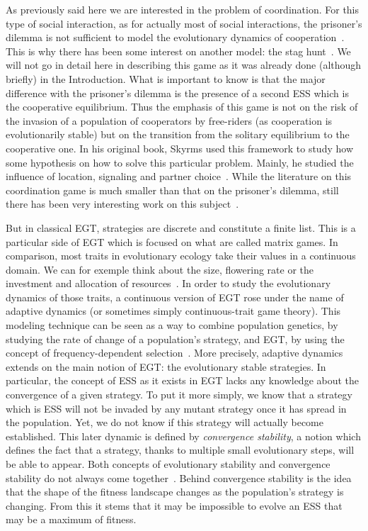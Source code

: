     As previously said here we are interested in the problem of coordination. For this type of social interaction, as for actually most of social interactions, the prisoner's dilemma is not sufficient to model the evolutionary dynamics of cooperation~\cite{Alvard2002, Skyrms2004}. This is why there has been some interest on another model: the stag hunt~\cite{Skyrms2004, RequejoMartinez2013}. We will not go in detail here in describing this game as it was already done (although briefly) in the Introduction. What is important to know is that the major difference with the prisoner's dilemma is the presence of a second ESS which is the cooperative equilibrium. Thus the emphasis of this game is not on the risk of the invasion of a population of cooperators by free-riders (as cooperation is evolutionarily stable) but on the transition from the solitary equilibrium to the cooperative one. In his original book, Skyrms used this framework to study how some hypothesis on how to solve this particular problem. Mainly, he studied the influence of location, signaling and partner choice~\cite{Skyrms2004}. While the literature on this coordination game is much smaller than that on the prisoner's dilemma, still there has been very interesting work on this subject~\cite{Santos2005, Pacheco2009, Iyer2016}.


    But in classical EGT, strategies are discrete and constitute a finite list. This is a particular side of EGT which is focused on what are called matrix games. In comparison, most traits in evolutionary ecology take their values in a continuous domain. We can for exemple think about the size, flowering rate or the investment and allocation of resources~\cite{McGill2007}. In order to study the evolutionary dynamics of those traits, a continuous version of EGT rose under the name of adaptive dynamics (or sometimes simply continuous-trait game theory). This modeling technique can be seen as a way to combine population genetics, by studying the rate of change of a population's strategy, and EGT, by using the concept of frequency-dependent selection~\cite{Geritz1998, McGill2007}. More precisely, adaptive dynamics extends on the main notion of EGT: the evolutionary stable strategies. In particular, the concept of ESS as it exists in EGT lacks any knowledge about the convergence of a given strategy. To put it more simply, we know that a strategy which is ESS will not be invaded by any mutant strategy once it has spread in the population. Yet, we do not know if this strategy will actually become established. This later dynamic is defined by \emph{convergence stability}, a notion which defines the fact that a strategy, thanks to multiple small evolutionary steps, will be able to appear. Both concepts of evolutionary stability and convergence stability do not always come together~\cite{Eshel1981, Eshel1983}. Behind convergence stability is the idea that the shape of the fitness landscape changes as the population's strategy is changing. From this it stems that it may be impossible to evolve an ESS that may be a maximum of fitness.

